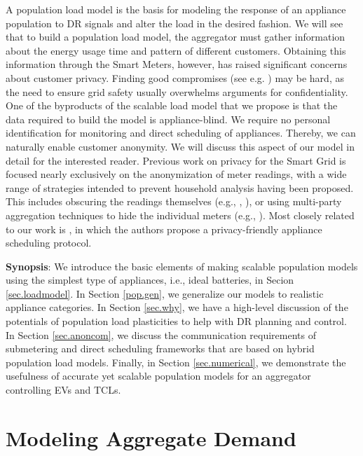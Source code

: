 \documentclass[10pt]{IEEEtran}
\begin{document}
A population load model is the basis for modeling the response of an appliance population to DR signals and alter the load in the desired fashion. We will see that to build a population load model,  the aggregator must gather information about the energy usage time and pattern of different customers.  Obtaining this information through the Smart Meters, however, has raised significant concerns about customer privacy. Finding good compromises (see e.g. \cite{lalitha})  may be hard, as the need to ensure grid safety usually overwhelms arguments
  for confidentiality.  
 One of the byproducts of the scalable load model that we propose is that the data required to build the model is appliance-blind. We require no personal identification for monitoring and direct scheduling of appliances. Thereby, we can naturally enable customer anonymity. We will discuss this aspect of our model in detail for the interested reader. Previous work on privacy for the Smart Grid is focused nearly exclusively on the anonymization of meter readings, with a wide range of strategies intended to prevent household analysis having been proposed. This includes obscuring the readings themselves (e.g., \cite{5622047}, \cite{Acs2011IDD2042445.2042457}), or using multi-party aggregation techniques to hide the individual meters (e.g., \cite{Garcia2010PEV2050149.2050164,5622064,Kursawe2011PAS2032162.2032172}).  
Most closely related to our work is \cite{rottondi2013privacy}, in which the authors propose a privacy-friendly appliance scheduling protocol.





\textbf{Synopsis}: We introduce the basic elements of making scalable population models using the simplest type of appliances, i.e., ideal batteries, in Secion \ref{sec.loadmodel}. In Section \ref{pop.gen}, we generalize our models to realistic appliance categories. In Section \ref{sec.why}, we have a high-level discussion of the potentials of population load plasticities to help with DR planning and control. In Section \ref{sec.anoncom}, we discuss the communication requirements of submetering and direct scheduling frameworks that are based on hybrid population load models. Finally, in Section \ref{sec.numerical}, we demonstrate the usefulness of accurate yet scalable population models for an aggregator controlling EVs and TCLs.

\section{Modeling Aggregate Demand}\label{sec.modeling}\label{sec.loadmodel}
\end{document}
